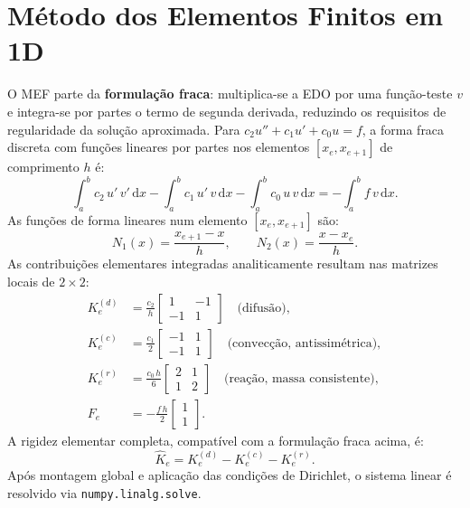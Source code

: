 \documentclass[12pt,a4paper]{article}
\begin{document}
\section{Método dos Elementos Finitos em 1D}
O MEF parte da \textbf{formulação fraca}: multiplica-se a EDO por uma função-teste $v$ e integra-se por partes o termo de segunda derivada, reduzindo os requisitos de regularidade da solução aproximada. Para
$c_2 u'' + c_1 u' + c_0 u = f$, a forma fraca discreta com funções lineares por partes nos elementos $[x_e, x_{e+1}]$ de comprimento $h$ é:
\begin{equation}
    \int_a^b c_2\,u'\,v'\,\mathrm{d}x
    - \int_a^b c_1\,u'\,v\,\mathrm{d}x
    - \int_a^b c_0\,u\,v\,\mathrm{d}x
    = -\int_a^b f\,v\,\mathrm{d}x.
\end{equation}
As funções de forma lineares num elemento $[x_e, x_{e+1}]$ são:
\begin{equation}
    N_1(x) = \frac{x_{e+1}-x}{h}, \qquad N_2(x) = \frac{x-x_e}{h}.
\end{equation}
As contribuições elementares integradas analiticamente resultam nas matrizes locais de $2\times2$:
\begin{align}
    K_e^{(d)} &= \frac{c_2}{h}\begin{bmatrix}1&-1\\-1&1\end{bmatrix} \quad\text{(difusão)},\\
    K_e^{(c)} &= \frac{c_1}{2}\begin{bmatrix}-1&1\\-1&1\end{bmatrix} \quad\text{(convecção, antissimétrica)},\\
    K_e^{(r)} &= \frac{c_0\,h}{6}\begin{bmatrix}2&1\\1&2\end{bmatrix} \quad\text{(reação, massa consistente)},\\
    F_e       &= -\frac{f\,h}{2}\begin{bmatrix}1\\1\end{bmatrix}.
\end{align}
A rigidez elementar completa, compatível com a formulação fraca acima, é:
\begin{equation}
    \hat{K}_e = K_e^{(d)} - K_e^{(c)} - K_e^{(r)}.
\end{equation}
Após montagem global e aplicação das condições de Dirichlet, o sistema linear é resolvido via \texttt{numpy.linalg.solve}.
\end{document}
